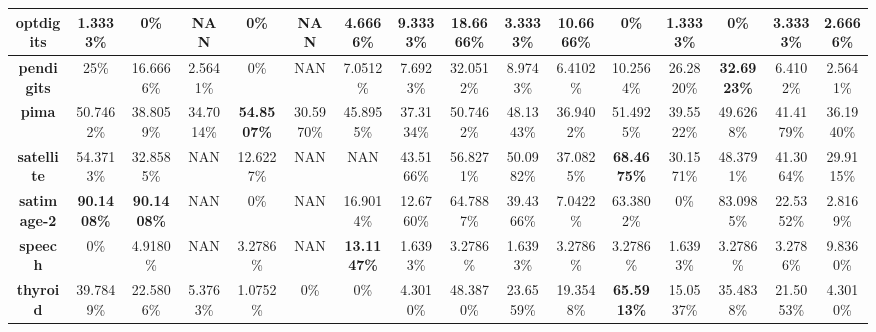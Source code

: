 \begin{table}
{\begin{tabular}{|c|c|c|c|c|c|c|c|c|c|c|c|c|c|c|c|}
		\textbf{optdigits}        & 1.3333\%           & 0\%                & NAN             & 0\%                & NAN           & 4.6666\%           & 9.3333\%           & \textbf{18.6666\%} & 3.3333\%     & 10.6666\%          & 0\%                & 1.3333\%           & 0\%                & 3.3333\%           & 2.6666\%     \\ \hline
		\textbf{pendigits}        & 25\%               & 16.6666\%          & 2.5641\%        & 0\%                & NAN           & 7.0512\%           & 7.6923\%           & 32.0512\%          & 8.9743\%     & 6.4102\%           & 10.2564\%          & 26.2820\%          & \textbf{32.6923\%} & 6.4102\%           & 2.5641\%     \\ \hline
		\textbf{pima}             & 50.7462\%          & 38.8059\%          & 34.7014\%       & \textbf{54.8507\%} & 30.5970\%     & 45.8955\%          & 37.3134\%          & 50.7462\%          & 48.1343\%    & 36.9402\%          & 51.4925\%          & 39.5522\%          & 49.6268\%          & 41.4179\%          & 36.1940\%    \\ \hline
		\textbf{satellite}        & 54.3713\%          & 32.8585\%          & NAN             & 12.6227\%          & NAN           & NAN                & 43.5166\%          & 56.8271\%          & 50.0982\%    & 37.0825\%          & \textbf{68.4675\%} & 30.1571\%          & 48.3791\%          & 41.3064\%          & 29.9115\%    \\ \hline
		\textbf{satimage-2}       & \textbf{90.1408\%} & \textbf{90.1408\%} & NAN             & 0\%                & NAN           & 16.9014\%          & 12.6760\%          & 64.7887\%          & 39.4366\%    & 7.0422\%           & 63.3802\%          & 0\%                & 83.0985\%          & 22.5352\%          & 2.8169\%     \\ \hline
		\textbf{speech}           & 0\%                & 4.9180\%           & NAN             & 3.2786\%           & NAN           & \textbf{13.1147\%} & 1.6393\%           & 3.2786\%           & 1.6393\%     & 3.2786\%           & 3.2786\%           & 1.6393\%           & 3.2786\%           & 3.2786\%           & 9.8360\%     \\ \hline
		\textbf{thyroid}          & 39.7849\%          & 22.5806\%          & 5.3763\%        & 1.0752\%           & 0\%           & 0\%                & 4.3010\%           & 48.3870\%          & 23.6559\%    & 19.3548\%          & \textbf{65.5913\%} & 15.0537\%          & 35.4838\%          & 21.5053\%          & 4.3010\%     \\ \hline

\end{tabular}}
\end{table}
